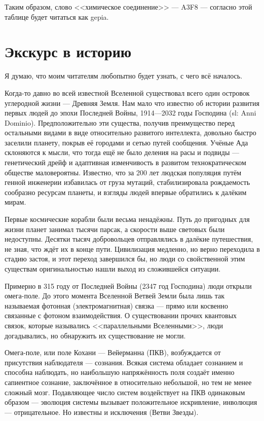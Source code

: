 \documentclass[a4paper,10pt]{book}
\begin{document}
Таким образом, слово <<химическое соединение>> --- A3F8 --- согласно этой 
таблице будет читаться как gepia.

\section{Экскурс в историю}

Я думаю, что моим читателям любопытно будет узнать, с чего всё началось.

Когда-то давно во всей известной Вселенной существовал всего один островок 
углеродной жизни --- Древняя Земля. Нам мало что известно об истории развития 
первых людей до эпохи Последней Войны, 
1914---2032 годы Господина (sl: Anni Dominio). 
Предположительно эти существа, получив преимущество 
перед остальными видами в виде относительно развитого интеллекта, довольно 
быстро заселили планету, покрыв её городами и сетью путей сообщения. Учёные Ада 
склоняются к мысли, что тогда ещё не было деления на расы и подвиды --- 
генетический дрейф и адаптивная изменчивость в развитом технократическом 
обществе маловероятны. Известно, что за 200 лет 
людская популяция путём генной инженерии избавилась от груза мутаций, 
стабилизировала рождаемость сообразно ресурсам планеты, и взгляды людей впервые 
обратились к далёким мирам.

Первые космические корабли были весьма ненадёжны. Путь до пригодных для 
жизни планет занимал тысячи парсак, а скорости выше световых были недоступны. 
Десятки тысяч добровольцев отправлялись в далёкие путешествия, не зная, что 
ждёт их в конце пути. 
Цивилизация медленно, но верно 
переходила в стадию застоя, и этот переход завершился бы, но люди со 
свойственной этим существам оригинальностью нашли выход из сложившейся ситуации.

Примерно в 315 году от Последней Войны (2347 год Господина) люди открыли 
омега-поле.
До этого момента Вселенной Ветвей Земли была лишь так называемая фотонная 
(электромагнитная) связка --- 
прямо или косвенно связанные с фотоном взаимодействия. О существовании прочих 
квантовых связок,
которые назывались <<параллельными Вселенными>>, люди догадывались, но 
обнаружить их существование не могли. 

Омега-поле, или поле Кохани --- Вейерманна (ПКВ), возбуждается от присутствия 
наблюдателя --- сознания. Всякая система обладает сознанием и способна 
наблюдать, но наибольшую напряжённость поля создаёт именно сапиентное сознание,
заключённое в относительно небольшой, но тем не менее сложный мозг.
Подавляющее число систем воздействует на ПКВ одинаковым образом --- эволюция 
системы вызывает положительное искривление, инволюция --- отрицательное. Но 
известны и исключения (Ветви Звезды).
\end{document}
